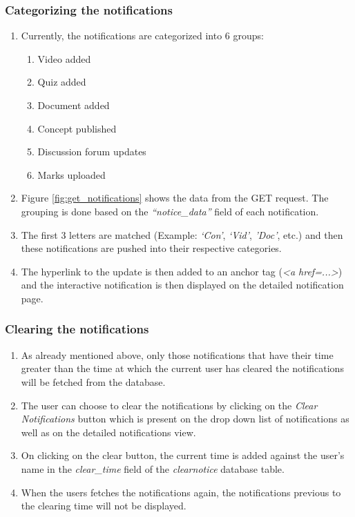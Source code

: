 \subsubsection{Categorizing the notifications}

\begin{enumerate}
	\item Currently, the notifications are categorized into 6 groups:
	\begin{enumerate}
		\item Video added
		\item Quiz added
		\item Document added
		\item Concept published
		\item Discussion forum updates
		\item Marks uploaded
	\end{enumerate}
	\item Figure \ref{fig:get_notifications} shows the data from the GET request. The grouping is done based on the \textit{``notice\_data''} field of each notification.
	\item The first 3 letters are matched (Example: \textit{`Con'}, \textit{`Vid'}, \textit{'Doc'}, etc.) and then these notifications are pushed into their respective categories.
	\item The hyperlink to the update is then added to an anchor tag  (\textit{\textless a href=...\textgreater}) and the interactive notification is then displayed on the detailed notification page.
\end{enumerate}

\subsubsection{Clearing the notifications}

\begin{enumerate}
	\item As already mentioned above, only those notifications that have their time greater than the time at which the current user has cleared the notifications will be fetched from the database.
	\item The user can choose to clear the notifications by clicking on the \textit{Clear Notifications} button which is present on the drop down list of notifications as well as on the detailed notifications view.
	\item On clicking on the clear button, the current time is added against the user's name in the \textit{clear\_time} field of the \textit{clearnotice} database table.
	\item When the users fetches the notifications again, the notifications previous to the clearing time will not be displayed.
\end{enumerate}